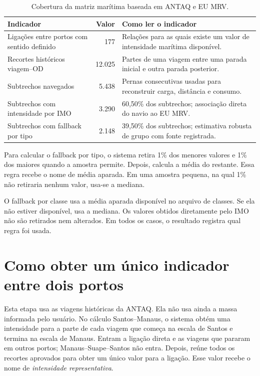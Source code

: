 \begin{table}[htbp]
\centering
\small
\caption{Cobertura da matriz marítima baseada em ANTAQ e EU MRV.}
\label{tab:cobertura-matriz-maritima}
\begin{tabularx}{\textwidth}{L{0.42\textwidth}r Y}
\toprule
Indicador & Valor & Como ler o indicador \\
\midrule
Ligações entre portos com sentido definido & 177 & Relações para as quais existe um valor de intensidade marítima disponível.\\
Recortes históricos viagem--OD & 12.025 & Partes de uma viagem entre uma parada inicial e outra parada posterior.\\
Subtrechos navegados & 5.438 & Pernas consecutivas usadas para reconstruir carga, distância e consumo.\\
Subtrechos com intensidade por IMO & 3.290 & 60,50\% dos subtrechos; associação direta do navio ao EU MRV.\\
Subtrechos com fallback por tipo & 2.148 & 39,50\% dos subtrechos; estimativa robusta de grupo com fonte registrada.\\
\bottomrule
\end{tabularx}
\end{table}

Para calcular o fallback por tipo, o sistema retira 1\% dos menores valores e 1\% dos maiores quando a amostra permite. Depois, calcula a média do restante. Essa regra recebe o nome de média aparada. Em uma amostra pequena, na qual 1\% não retiraria nenhum valor, usa-se a mediana.

O fallback por classe usa a média aparada disponível no arquivo de classes. Se ela não estiver disponível, usa a mediana. Os valores obtidos diretamente pelo IMO não são retirados nem alterados. Em todos os casos, o resultado registra qual regra foi usada.

\section{Como obter um único indicador entre dois portos}
\label{sec:intensidade-od-resultados}

Esta etapa usa as viagens históricas da ANTAQ. Ela não usa ainda a massa informada pelo usuário. No cálculo Santos--Manaus, o sistema obtém uma intensidade para a parte de cada viagem que começa na escala de Santos e termina na escala de Manaus. Entram a ligação direta e as viagens que pararam em outros portos; Manaus--Suape--Santos não entra. Depois, reúne todos os recortes aprovados para obter um único valor para a ligação. Esse valor recebe o nome de \emph{intensidade representativa}.

